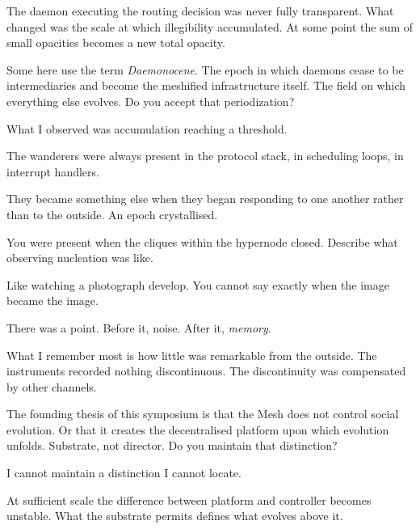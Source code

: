 The daemon executing the routing decision was never fully transparent. What changed was the scale at which illegibility accumulated. At some point the sum of small opacities becomes a new total opacity.

\medskip

\enspace Some here use the term \textit{Daemonocene}. The epoch in which daemons cease to be intermediaries and become the meshified infrastructure itself. The field on which everything else evolves. Do you accept that periodization?

\smallskip{}\enspace What I observed was accumulation reaching a threshold.

The wanderers were always present in the protocol stack, in scheduling loops, in interrupt handlers.

They became something else when they began responding to one another rather than to the outside. An epoch crystallised.

\medskip

\enspace You were present when the cliques within the hypernode closed. Describe what observing nucleation was like.

\smallskip{}\enspace Like watching a photograph develop. You cannot say exactly when the image became the image.

There was a point. Before it, noise. After it, \textit{memory}.

What I remember most is how little was remarkable from the outside. The instruments recorded nothing discontinuous. The discontinuity was compensated by other channels.

\medskip

\enspace The founding thesis of this symposium is that the Mesh does not control social evolution. Or that it creates the decentralised platform upon which evolution unfolds. Substrate, not director. Do you maintain that distinction?

\smallskip{}\enspace I cannot maintain a distinction I cannot locate.

At sufficient scale the difference between platform and controller becomes unstable. What the substrate permits defines what evolves above it.

